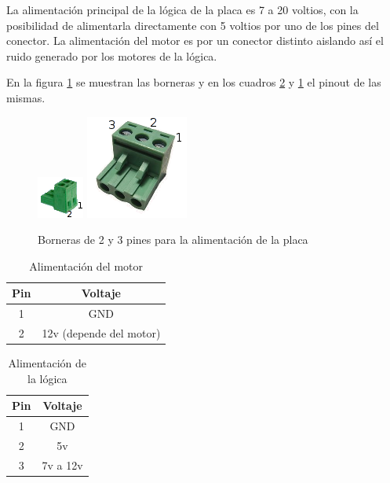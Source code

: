 \documentclass[a4paper,10pt]{article}
\begin{document}
La alimentaci\'on principal de la l\'ogica de la placa es 7 a 20 voltios, con la posibilidad de alimentarla directamente 
con 5 voltios por uno de los pines del conector.
La alimentaci\'on del motor es por un conector distinto aislando as\'i el ruido generado por los motores de la l\'ogica.

En la figura \ref{borneras} se muestran las borneras y en los cuadros \ref{alimentacionLogica} y \ref{alimentacionMotor} el pinout de las mismas.

\begin{figure}
\centering
\includegraphics[scale=1]{bornera2.png}
\includegraphics[scale=.5]{bornera3.png}
\caption{Borneras de 2 y 3 pines para la alimentaci\'on de la placa}
\label{borneras}
\end{figure}

\begin{table}
\begin{center}
\begin{tabular}{|c|c|}
\hline
Pin & Voltaje \\
\hline
1 & GND \\
\hline
2 & 12v (depende del motor) \\
\hline
\end{tabular}
\caption{Alimentaci\'on del motor}
\label{alimentacionMotor}
\end{center}
\end{table}

\begin{table}
\begin{center}
\begin{tabular}{|c|c|}
\hline
Pin & Voltaje \\
\hline
1 & GND \\
\hline
2 & 5v \\
\hline
3 & 7v a 12v \\
\hline
\end{tabular}
\caption{Alimentaci\'on de la l\'ogica}
\label{alimentacionLogica}
\end{center}
\end{table}
\end{document}
